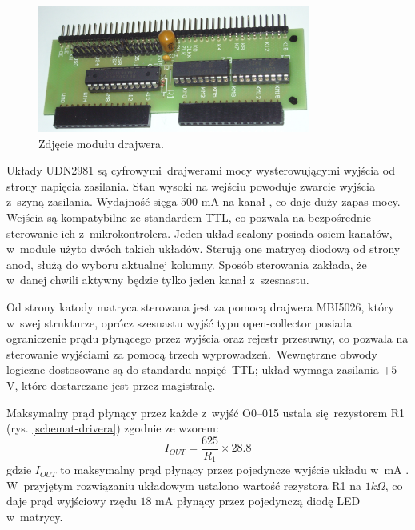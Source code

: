 \begin{figure}[t]
    \begin{center}
       \includegraphics[width=0.8\textwidth]{figures/zdj-driver.jpg}
    \end{center}

    \caption{Zdjęcie modułu drajwera.}
    \label{zdj-driver}
\end{figure}

Układy UDN2981 są cyfrowymi drajwerami mocy wysterowującymi wyjścia od strony napięcia zasilania.  Stan wysoki na wejściu powoduje zwarcie wyjścia z~szyną zasilania. Wydajność sięga $500$ mA na kanał \cite{ds-udn}, co daje duży zapas mocy. Wejścia są kompatybilne ze standardem TTL, co pozwala na bezpośrednie sterowanie ich z~mikrokontrolera. Jeden układ scalony posiada osiem kanałów, w~module użyto dwóch takich układów. Sterują one matrycą diodową od strony anod, służą do wyboru aktualnej kolumny. Sposób sterowania zakłada, że w~danej chwili aktywny będzie tylko jeden kanał z~szesnastu.

Od strony katody matryca sterowana jest za pomocą drajwera MBI5026, który w~swej strukturze, oprócz szesnastu wyjść typu open-collector posiada ograniczenie prądu płynącego przez wyjścia oraz rejestr przesuwny, co pozwala na sterowanie wyjściami za pomocą trzech wyprowadzeń.~Wewnętrzne obwody logiczne dostosowane są do standardu napięć TTL; układ wymaga zasilania $+5$ V, które dostarczane jest przez magistralę.

Maksymalny prąd płynący przez każde z~wyjść O0--015 ustala się rezystorem R1 (rys. \ref{schemat-drivera}) zgodnie ze wzorem:
$$ I_{OUT} = \frac{625}{R_1} \times 28.8 $$
gdzie $I_{OUT}$ to maksymalny prąd płynący przez pojedyncze wyjście układu w~mA \cite{ds-mbi}. W~przyjętym rozwiązaniu układowym ustalono wartość rezystora R1 na $ 1 k\Omega$, co daje prąd wyjściowy rzędu $18$ mA płynący przez pojedynczą diodę LED w~matrycy.

